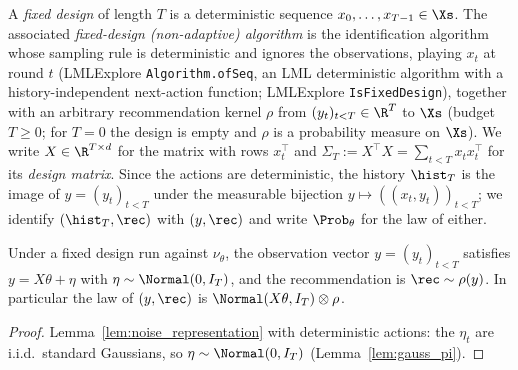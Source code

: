 \begin{definition}\label{def:fixed_design}
\leanok
{}
A \emph{fixed design} of length $T$ is a deterministic sequence $x_0, \dots, x_{T-1} \in \Xs$.
The associated \emph{fixed-design (non-adaptive) algorithm} is the identification algorithm
whose sampling rule is deterministic and ignores the observations, playing $x_t$ at round
$t$ (LMLExplore \texttt{Algorithm.ofSeq}, an LML deterministic algorithm with a
history-independent next-action function; LMLExplore \texttt{IsFixedDesign}), together with
an arbitrary recommendation kernel $\rho$ from $(y_t)_{t<T} \in \R^T$ to $\Xs$ (budget
$T \ge 0$; for $T = 0$ the design is empty and $\rho$ is a probability measure on $\Xs$). We write
$X \in \R^{T \times d}$ for the matrix with rows $x_t^\top$ and
$\Sigma_T := X^\top X = \sum_{t<T} x_t x_t^\top$ for its \emph{design matrix}. Since the actions
are deterministic, the history $\hist_T$ is the image of $y = (y_t)_{t<T}$ under the measurable
bijection $y \mapsto ((x_t, y_t))_{t<T}$; we identify $(\hist_T, \rec)$ with $(y, \rec)$ and
write $\Prob_\theta$ for the law of either.
\end{definition}

\begin{lemma}\label{lem:fixed_design_law}
\leanok
{}
Under a fixed design run against $\nu_\theta$, the observation vector
$y = (y_t)_{t<T}$ satisfies $y = X\theta + \eta$ with $\eta \sim \Normal(0, I_T)$, and
the recommendation is $\rec \sim \rho(y)$. In particular the law of $(y, \rec)$ is
$\Normal(X\theta, I_T) \otimes \rho$.
\end{lemma}

\begin{proof}
\leanok
{}
Lemma~\ref{lem:noise_representation} with deterministic actions: the $\eta_t$ are i.i.d.\
standard Gaussians, so $\eta \sim \Normal(0,I_T)$ (Lemma~\ref{lem:gauss_pi}).
\end{proof}

